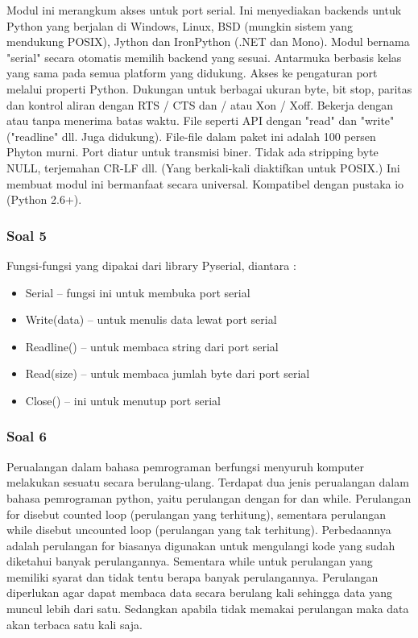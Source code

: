 Modul ini merangkum akses untuk port serial. Ini menyediakan backends untuk Python yang berjalan di Windows, Linux, BSD (mungkin sistem yang mendukung POSIX), Jython dan IronPython (.NET dan Mono). Modul bernama "serial" secara otomatis memilih backend yang sesuai. Antarmuka berbasis kelas yang sama pada semua platform yang didukung.
Akses ke pengaturan port melalui properti Python. 
Dukungan untuk berbagai ukuran byte, bit stop, paritas dan kontrol aliran dengan RTS / CTS dan / atau Xon / Xoff.
Bekerja dengan atau tanpa menerima batas waktu.
File seperti API dengan "read" dan "write" ("readline" dll. Juga didukung).
File-file dalam paket ini adalah 100 persen Phyton murni.
Port diatur untuk transmisi biner. Tidak ada stripping byte NULL, terjemahan CR-LF dll. (Yang berkali-kali diaktifkan untuk POSIX.) Ini membuat modul ini bermanfaat secara universal.
Kompatibel dengan pustaka io (Python 2.6+).

\subsubsection{Soal 5}


Fungsi-fungsi yang dipakai dari library Pyserial, diantara :
\begin{itemize}
\item Serial – fungsi ini untuk membuka port serial
\item Write(data) – untuk menulis data lewat port serial
\item Readline() – untuk membaca string dari port serial
\item Read(size) – untuk membaca jumlah byte dari port serial
\item Close() – ini untuk menutup port serial 
\end{itemize}

\subsubsection{Soal 6}


Perualangan dalam bahasa pemrograman berfungsi menyuruh komputer melakukan sesuatu secara berulang-ulang. Terdapat dua jenis perualangan dalam bahasa pemrograman python, yaitu perulangan dengan for dan while. Perulangan for disebut counted loop (perulangan yang terhitung), sementara perulangan while disebut uncounted loop (perulangan yang tak terhitung). Perbedaannya adalah perulangan for biasanya digunakan untuk mengulangi kode yang sudah diketahui banyak perulangannya. Sementara while untuk perulangan yang memiliki syarat dan tidak tentu berapa banyak perulangannya. Perulangan diperlukan agar dapat membaca data secara berulang kali sehingga data yang muncul lebih dari satu.  Sedangkan apabila tidak memakai perulangan maka data akan terbaca satu kali saja.

